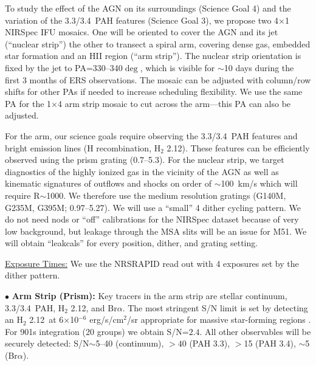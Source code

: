\documentclass[12pt]{article}
\begin{document}
\vspace{0.1in}

 To study the effect of the AGN on its surroundings (Science Goal 4) and the variation of the 3.3/3.4\micron\ PAH features (Science Goal 3), we propose two 4$\times$1 NIRSpec IFU mosaics. One will be oriented to cover the AGN and its jet (``nuclear strip'') the other to transect a spiral arm, covering dense gas, embedded star formation and an H{\small II} region (``arm strip''). The nuclear strip orientation is fixed by the jet to PA=330--340$\deg$, which is visible for $\sim$10 days during the first 3 months of ERS observations. The mosaic can be adjusted with column/row shifts for other PAs if needed to increase scheduling flexibility. We use the same PA for the 1$\times$4 arm strip mosaic to cut across the arm---this PA can also be adjusted.

For the arm, our science goals require observing the 3.3/3.4\micron\ PAH features and bright emission lines (H recombination, H$_2$ 2.12\micron). These features can be efficiently observed using the prism grating (0.7--5.3\micron).  For the nuclear strip, we target diagnostics of the highly ionized gas in the vicinity of the AGN as well as kinematic signatures of outflows and shocks on order of $\sim$100~km/s which will require R$\sim$1000. We therefore use the medium resolution gratings (G140M, G235M, G395M; 0.97--5.27\micron). We will use a ``small'' 4 dither cycling pattern.  We do not need nods or ``off'' calibrations for the NIRSpec dataset because of very low background, but leakage through the MSA slits will be an issue for M51. We will obtain ``leakcals'' for every position, dither, and grating setting. %

\vspace{0.05in}

\noindent \underline{Exposure Times:} We use the NRSRAPID read out with 4 exposures set by the dither pattern.

\noindent $\bullet$ {\bf Arm Strip (Prism):} Key tracers in the arm strip are stellar continuum, 3.3/3.4\micron\ PAH, H$_2$ 2.12\micron, and Br$\alpha$.  The most stringent S/N limit is set by detecting an H$_2$ 2.12\micron\ at 6$\times$10$^{-6}$ erg/s/cm$^2$/sr appropriate for massive star-forming regions \citep{yeh2015}. For 901s integration (20 groups) we obtain S/N=$2.4$. All other observables will be securely detected: S/N$\sim$5--40 (continuum), $>40$ (PAH 3.3\micron), $>$15 (PAH 3.4\micron), $\sim$5 (Br$\alpha$).
\end{document}
